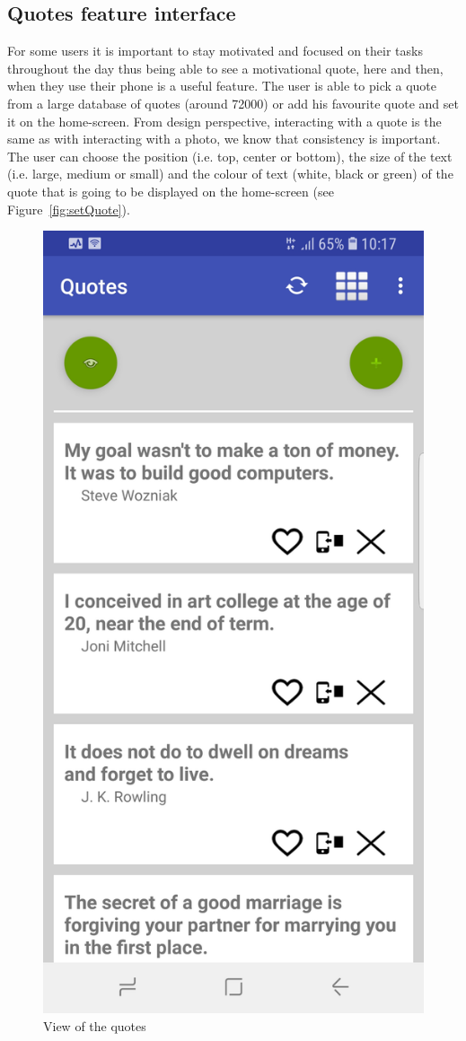 \documentclass[version=last,fontsize=13pt]{scrartcl}
\begin{document}
\subsection{Quotes feature interface}
	For some users it is important to stay motivated and focused on their tasks throughout the day thus being able to see a motivational quote, here and then, when they use their phone is a useful feature. The user is able to pick a quote from a large database of quotes (around 72000) or add his favourite quote and set it on the home-screen. From design perspective, interacting with a quote is the same as with interacting with a photo,  we know that consistency is important. The user  can choose the position (i.e. top, center or bottom), the size of the text (i.e. large, medium or small) and the colour of text (white, black or green)  of the quote that is going to be displayed on the home-screen (see Figure~\ref{fig:setQuote}).  


\begin{figure}[H]

  \centering
  \includegraphics[width=.3\linewidth]{imgs/QuotesList.jpg}
  \caption{View of the quotes}
  \label{fig:quotes}

\end{figure}
\end{document}
